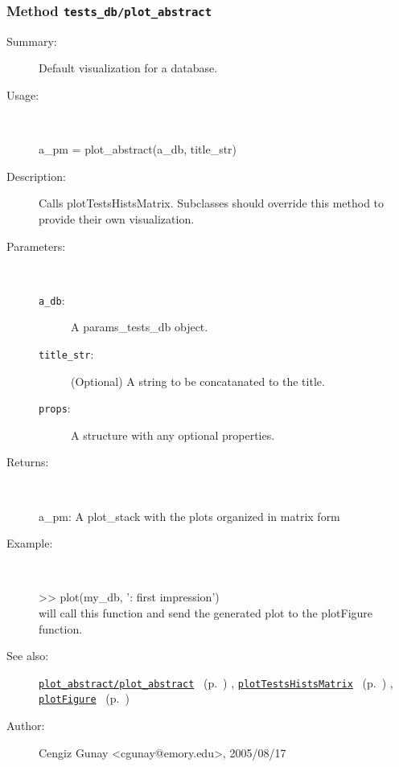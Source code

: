 \subsubsection[Method \texttt{plot\_abstract}]{Method \texttt{tests\_db/plot\_abstract}}%
%
\label{ref_tests_db__plot_abstract}%
\hypertarget{ref_tests_db__plot_abstract}{}%
\begin{description}
\item[Summary:]Default visualization for a database.
%
\item[Usage:]~%
\begin{lyxcode}%
a\_pm = plot\_abstract(a\_db, title\_str)
%
\end{lyxcode}%
%
\item[Description:]%
Calls plotTestsHistsMatrix. Subclasses should override this method
 to provide their own visualization.
\item[Parameters:]~
\begin{description}%
\item[\texttt{a\_db}:]
 A params\_tests\_db object.
\item[\texttt{title\_str}:]
 (Optional) A string to be concatanated to the title.
\item[\texttt{props}:]
 A structure with any optional properties.
\end{description}%
%
\item[Returns:]~

	a\_pm: A plot\_stack with the plots organized in matrix form
%
\item[Example:]~
\begin{lyxcode}   >> plot(my\_db, ': first impression')\\%
 will call this function and send the generated plot to the plotFigure function.\\%
\end{lyxcode}
%
\item[See also:]%
\hyperlink{ref_plot_abstract__plot_abstract}{\texttt{plot\_abstract/plot\_abstract}}%
\ (p.~\pageref{ref_plot_abstract__plot_abstract})%
%
, \hyperlink{ref_plotTestsHistsMatrix}{\texttt{plotTestsHistsMatrix}}%
\ (p.~\pageref{ref_plotTestsHistsMatrix})%
%
, \hyperlink{ref_plotFigure}{\texttt{plotFigure}}%
\ (p.~\pageref{ref_plotFigure})%
%
%
\item[Author:]%
Cengiz Gunay <cgunay@emory.edu>, 2005/08/17%
\end{description}
\methodline%
